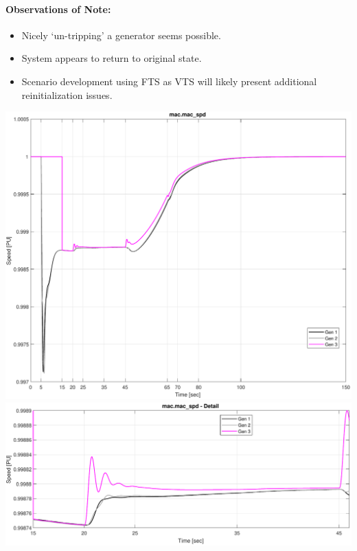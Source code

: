\documentclass[12pt]{article}
\begin{document}
\paragraph{Observations of Note:}
\begin{itemize}
 em
\item Nicely `un-tripping' a generator seems possible.
\item System appears to return to original state.
\item Scenario development using FTS as VTS will likely present additional reinitialization issues.
\end{itemize}

\pagebreak
\includegraphics[width=\linewidth]{combinedSpeed}
\includegraphics[width=\linewidth]{combinedSpeedDetail}
\end{document}
